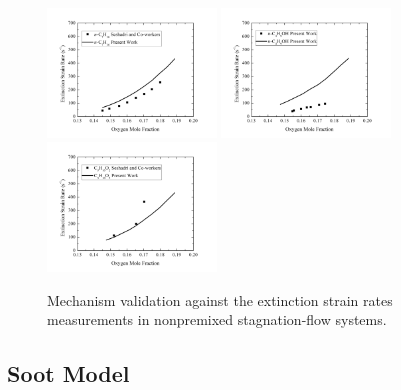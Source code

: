 \documentclass[review,3p,times]{elsarticleUS}
\begin{document}
\begin{figure}[t]
  \centering
  \scriptsize
  \includegraphics[trim=4mm 8mm 30mm 20mm, clip=true, width=0.4\textwidth]{NH-ESR.png}
  \includegraphics[trim=4mm 8mm 30mm 20mm, clip=true, width=0.4\textwidth]{NB-ESR.png}\\
   \vspace{0.5in}
  \includegraphics[trim=4mm 8mm 30mm 20mm, clip=true, width=0.4\textwidth]{MB-ESR.png}
  \normalsize
  \vspace{-0.1in}
  \caption{Mechanism validation against the extinction strain rates measurements in nonpremixed stagnation-flow systems.}
  \label{fig:validation-ESR}
\end{figure}

\subsection{Soot Model}
\end{document}
